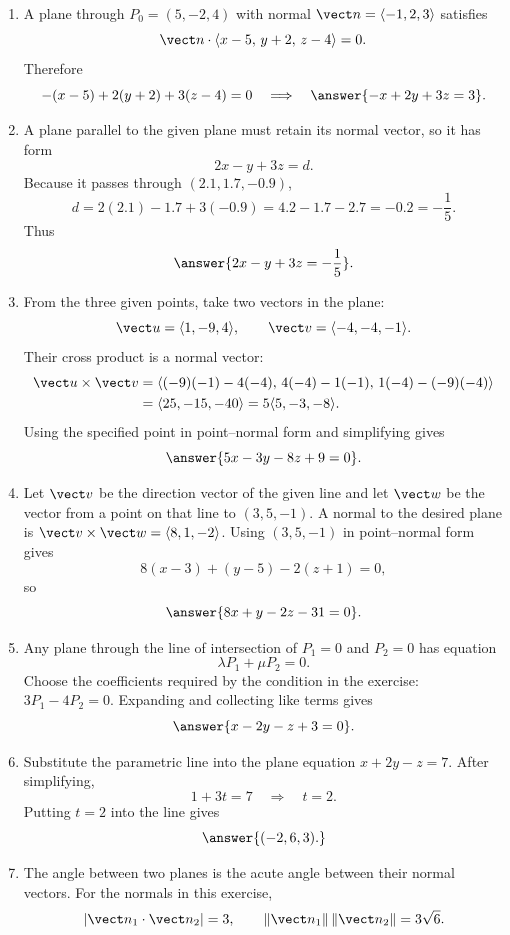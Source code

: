 \begin{enumerate}[label=\textbf{\arabic*.}, start=3]
\[
(x,y,z)=(4,-1,-5).
\]
Since this point satisfies both sets of parametric equations,
\[\answer{\text{the lines intersect at }(4,-1,-5).}\]
\setcounter{enumi}{24}
\item A plane through $P_0=(5,-2,4)$ with normal $\vect n=\langle-1,2,3\rangle$ satisfies
\[
\vect n\cdot\langle x-5,\,y+2,\,z-4\rangle=0.
\]
Therefore
\[
-(x-5)+2(y+2)+3(z-4)=0
\quad\Longrightarrow\quad
\answer{-x+2y+3z=3}.
\]
\setcounter{enumi}{28}
\item A plane parallel to the given plane must retain its normal vector, so it has form
\[
2x-y+3z=d.
\]
Because it passes through $(2.1,1.7,-0.9)$,
\[
d=2(2.1)-1.7+3(-0.9)=4.2-1.7-2.7=-0.2=-\frac15.
\]
Thus \[\answer{2x-y+3z=-\frac15}.\]
\setcounter{enumi}{32}
\item From the three given points, take two vectors in the plane:
\[
\vect u=\langle1,-9,4\rangle,\qquad \vect v=\langle-4,-4,-1\rangle.
\]
Their cross product is a normal vector:
\[
\begin{aligned}
\vect u\times\vect v
&=\left\langle(-9)(-1)-4(-4),\,4(-4)-1(-1),\,1(-4)-(-9)(-4)\right\rangle\\
&=\langle25,-15,-40\rangle
=5\langle5,-3,-8\rangle.
\end{aligned}
\]
Using the specified point in point--normal form and simplifying gives
\[\answer{5x-3y-8z+9=0}.\]
\setcounter{enumi}{34}
\item Let $\vect v$ be the direction vector of the given line and let $\vect w$ be the vector from a point on that line to $(3,5,-1)$.  A normal to the desired plane is $\vect v\times\vect w=\langle8,1,-2\rangle$.  Using $(3,5,-1)$ in point--normal form gives
\[
8(x-3)+(y-5)-2(z+1)=0,
\]
so \[\answer{8x+y-2z-31=0}.\]
\setcounter{enumi}{36}
\item Any plane through the line of intersection of $P_1=0$ and $P_2=0$ has equation
\[
\lambda P_1+\mu P_2=0.
\]
Choose the coefficients required by the condition in the exercise: $3P_1-4P_2=0$.  Expanding and collecting like terms gives
\[\answer{x-2y-z+3=0}.\]
\setcounter{enumi}{44}
\item Substitute the parametric line into the plane equation $x+2y-z=7$.  After simplifying,
\[
1+3t=7\quad\Longrightarrow\quad t=2.
\]
Putting $t=2$ into the line gives
\[\answer{(-2,6,3).}\]
\setcounter{enumi}{52}
\item The angle between two planes is the acute angle between their normal vectors.  For the normals in this exercise,
\[
|\vect n_1\cdot\vect n_2|=3,
\qquad \|\vect n_1\|\,\|\vect n_2\|=3\sqrt6.
\]
\end{enumerate}

